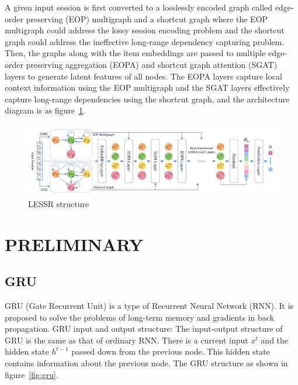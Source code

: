 \documentclass{article}
\begin{document}
A given input session is first converted to a losslessly encoded graph
called edge-order preserving (EOP) multigraph and a shortcut graph
where the EOP multigraph could address the lossy session encoding
problem and the shortcut graph could address
the ineffective long-range dependency capturing problem.
Then, the graphs along with the item embeddings are passed
to multiple edge-order preserving aggregation (EOPA)
and shortcut graph attention (SGAT) layers
to generate latent features of all nodes.
The EOPA layers capture local context information using the EOP multigraph
and the SGAT layers effectively capture long-range dependencies using
the shortcut graph, and the architecture diagram is as figure~\ref{fig:lessr}.

\begin{figure}
    \centering
    \includegraphics[scale=0.35]{lessr}
    \caption{LESSR structure}
    \label{fig:lessr}
\end{figure}




\section{PRELIMINARY}

\subsection{GRU}

GRU (Gate Recurrent Unit) is a type of Recurrent Neural Network (RNN).
It is proposed to solve the problems of long-term memory and
gradients in back propagation.
GRU input and output structure:
The input-output structure of GRU is the same as that of ordinary RNN.
There is a current input $x^t$ and the hidden state $h^{t-1}$ passed down
from the previous node. This hidden state contains information
about the previous node.
The GRU structure as shown in figure~\ref{fig:gru}.
\end{document}
